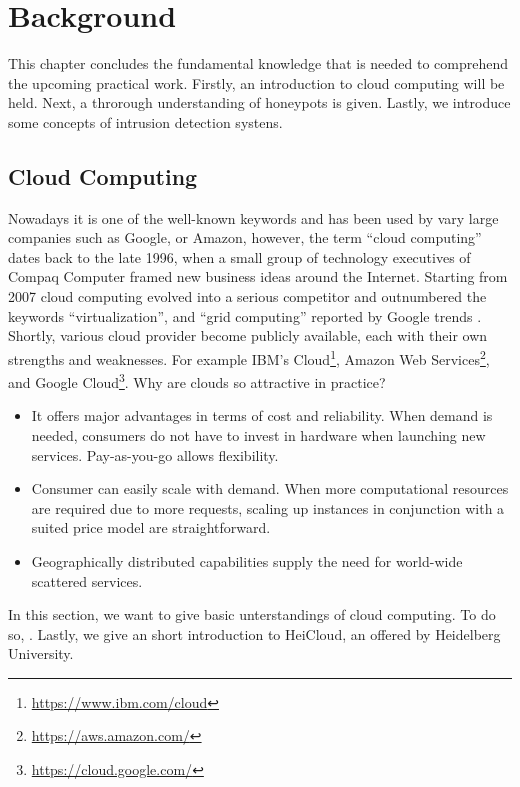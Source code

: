 \chapter{Background}

This chapter concludes the fundamental knowledge that is needed to comprehend the upcoming practical work. Firstly, an introduction to cloud computing will be held. Next, a throrough understanding of honeypots is given. Lastly, we introduce some concepts of intrusion detection systens.

\section{Cloud Computing}

Nowadays it is one of the well-known keywords and has been used by vary large companies such as Google, or Amazon, however, the term \enquote{cloud computing} dates back to the late 1996, when a small group of technology executives of Compaq Computer framed new business ideas around the Internet.\cite{regalado2020} Starting from 2007 cloud computing evolved into a serious competitor and outnumbered the keywords \enquote{virtualization}, and \enquote{grid computing} reported by Google trends \cite{Wang2010}. Shortly, various cloud provider become publicly available, each with their own strengths and weaknesses. For example IBM's Cloud\footnote{\url{https://www.ibm.com/cloud}}, Amazon Web Services\footnote{\url{https://aws.amazon.com/}}, and Google Cloud\footnote{\url{https://cloud.google.com/}}. Why are clouds so attractive in practice?

\begin{itemize}
    \item It offers major advantages in terms of cost and reliability. When demand is needed, consumers do not have to invest in hardware when launching new services. Pay-as-you-go allows flexibility.
    \item Consumer can easily scale with demand. When more computational resources are required due to more requests, scaling up instances in conjunction with a suited price model are straightforward.
    \item Geographically distributed capabilities supply the need for world-wide scattered services.
\end{itemize}

In this section, we want to give basic unterstandings of cloud computing. To do so, . Lastly, we give an short introduction to HeiCloud, an offered by Heidelberg University.

